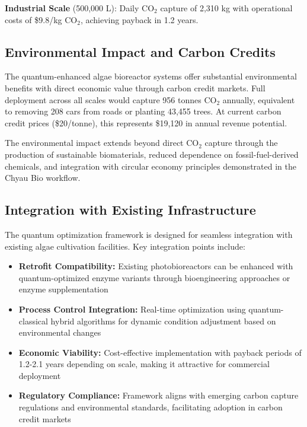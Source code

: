 \documentclass{article}
\begin{document}
\textbf{Industrial Scale} (500,000 L): Daily CO$_2$ capture of 2,310 kg with operational costs of \$9.8/kg CO$_2$, achieving payback in 1.2 years.

\subsection{Environmental Impact and Carbon Credits}

The quantum-enhanced algae bioreactor systems offer substantial environmental benefits with direct economic value through carbon credit markets. Full deployment across all scales would capture 956 tonnes CO$_2$ annually, equivalent to removing 208 cars from roads or planting 43,455 trees. At current carbon credit prices (\$20/tonne), this represents \$19,120 in annual revenue potential.

The environmental impact extends beyond direct CO$_2$ capture through the production of sustainable biomaterials, reduced dependence on fossil-fuel-derived chemicals, and integration with circular economy principles demonstrated in the Chyau Bio workflow.

\subsection{Integration with Existing Infrastructure}

The quantum optimization framework is designed for seamless integration with existing algae cultivation facilities. Key integration points include:

\begin{itemize}
\item \textbf{Retrofit Compatibility:} Existing photobioreactors can be enhanced with quantum-optimized enzyme variants through bioengineering approaches or enzyme supplementation
\item \textbf{Process Control Integration:} Real-time optimization using quantum-classical hybrid algorithms for dynamic condition adjustment based on environmental changes
\item \textbf{Economic Viability:} Cost-effective implementation with payback periods of 1.2-2.1 years depending on scale, making it attractive for commercial deployment
\item \textbf{Regulatory Compliance:} Framework aligns with emerging carbon capture regulations and environmental standards, facilitating adoption in carbon credit markets
\end{itemize}
\end{document}
